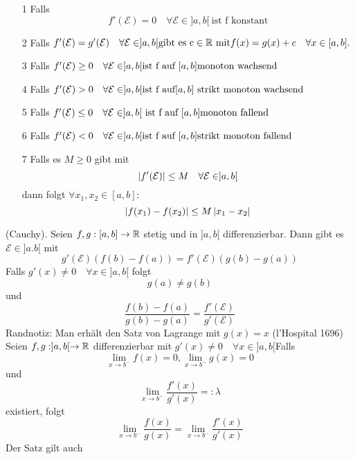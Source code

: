 \begin{enumerate}
    \item [1] Falls \[f'(\mathcal{E}) = 0 \quad \forall \mathcal{E} \in ]a,b[ \  \text{ist f konstant}\]
    \item [2] Falls \(f'(\mathcal{E}) = g'(\mathcal{E}) \quad \forall \mathcal{E} \in ]a,b[ \\ \text{gibt es c} \in \mathbb{R} \text{ mit} f(x) = g(x) + c \quad \forall x \in [a,b].\)
    \item [3] Falls \(f'(\mathcal{E}) \geq 0 \quad \forall \mathcal{E} \in ]a,b[ \\ \text{ist f auf } [a,b] \text{monoton wachsend}\)
    \item [4] Falls \(f'(\mathcal{E}) > 0 \quad \forall \mathcal{E} \in ]a,b[ \\ \text{ist f auf} [a,b] \text{ strikt monoton wachsend}\)
    \item [5] Falls \(f'(\mathcal{E}) \leq 0 \quad \forall \mathcal{E} \in ]a,b[ \\\text{ ist f auf } [a,b] \text{monoton fallend}\)
    \item [6] Falls \(f'(\mathcal{E}) < 0 \quad \forall \mathcal{E} \in ]a,b[ \\ \text{ist f auf } [a,b] \text{strikt monoton fallend}\)
    \item [7] Falls es \(M \geq 0 \) gibt mit
    \[\left\lvert f'(\mathcal{E}) \right\rvert \leq M \quad \forall \mathcal{E} \in ]a,b[\]
    dann folgt \( \forall x_1, x_2 \in [a,b] : \)
    \[\left\lvert f(x_1) - f(x_2) \right\rvert \leq M \left\lvert x_1 - x_2 \right\rvert\]
\end{enumerate}
\Satz[4.22] (Cauchy). Seien \(f,g : [a,b] \rightarrow \mathbb{R} \) stetig und in \(]a,b[\) differenzierbar. Dann gibt es \( \mathcal{E} \in ]a.b[ \) mit 
\[ g'(\mathcal{E}) (f(b) - f(a)) = f'(\mathcal{E}) (g(b) - g(a))\]
Falls \(g'(x) \neq 0 \quad \forall x \in ]a,b[ \) folgt
\[g(a) \neq g(b)\]
und
\[\frac{f(b) - f(a)}{g(b) - g(a) } = \frac{f'(\mathcal{E})}{g'(\mathcal{E})}\]
Randnotiz: Man erhält den Satz von Lagrange mit \(g(x) = x\) \newline
\Satz[4.23] (l'Hospital 1696) Seien \(f,g : ]a,b[ \rightarrow \mathbb{R} \) differenzierbar mit \(g'(x) \neq 0 \quad \forall x \in ]a,b[\)\newline Falls
\[ \lim\limits_{x \rightarrow b^-}f(x) = 0, \lim\limits_{x \rightarrow b^-} g(x) = 0\]
und
\[ \lim\limits_{x \rightarrow b^-} \frac{f'(x)}{g'(x)} =: \lambda\]
existiert, folgt
\[ \lim\limits_{x \rightarrow b^-} \frac{f(x)}{g(x)} = \lim\limits_{x \rightarrow b^-} \frac{f'(x)}{g'(x)}\]
 Der Satz gilt auch 
